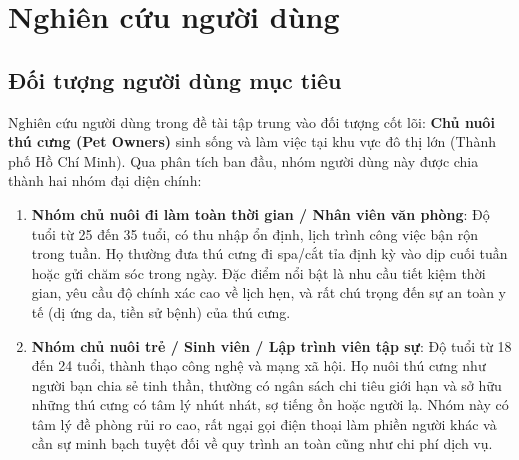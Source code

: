 \section{Nghiên cứu người dùng}

\subsection{Đối tượng người dùng mục tiêu}
Nghiên cứu người dùng trong đề tài tập trung vào đối tượng cốt lõi: \textbf{Chủ nuôi thú cưng (Pet Owners)} sinh sống và làm việc tại khu vực đô thị lớn (Thành phố Hồ Chí Minh). Qua phân tích ban đầu, nhóm người dùng này được chia thành hai nhóm đại diện chính:
\begin{enumerate}
    \item \textbf{Nhóm chủ nuôi đi làm toàn thời gian / Nhân viên văn phòng}: Độ tuổi từ 25 đến 35 tuổi, có thu nhập ổn định, lịch trình công việc bận rộn trong tuần. Họ thường đưa thú cưng đi spa/cắt tỉa định kỳ vào dịp cuối tuần hoặc gửi chăm sóc trong ngày. Đặc điểm nổi bật là nhu cầu tiết kiệm thời gian, yêu cầu độ chính xác cao về lịch hẹn, và rất chú trọng đến sự an toàn y tế (dị ứng da, tiền sử bệnh) của thú cưng.
    \item \textbf{Nhóm chủ nuôi trẻ / Sinh viên / Lập trình viên tập sự}: Độ tuổi từ 18 đến 24 tuổi, thành thạo công nghệ và mạng xã hội. Họ nuôi thú cưng như người bạn chia sẻ tinh thần, thường có ngân sách chi tiêu giới hạn và sở hữu những thú cưng có tâm lý nhút nhát, sợ tiếng ồn hoặc người lạ. Nhóm này có tâm lý đề phòng rủi ro cao, rất ngại gọi điện thoại làm phiền người khác và cần sự minh bạch tuyệt đối về quy trình an toàn cũng như chi phí dịch vụ.
\end{enumerate}

